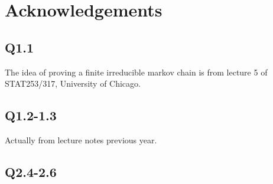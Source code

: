 \documentclass[12pt,letterpaper]{article}
\begin{document}
\subsection{}


\newpage
\section{Acknowledgements}
\subsection*{Q1.1}
The idea of proving a finite irreducible markov chain is from lecture 5 of STAT253/317, University of Chicago.
\subsection*{Q1.2-1.3}
Actually from lecture notes previous year.
\subsection*{Q2.4-2.6}
\end{document}
